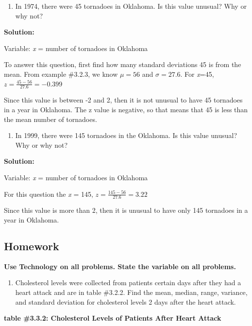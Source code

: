 \documentclass[
]{book}
\providecommand{\tightlist}{%
  \setlength{\itemsep}{0pt}\setlength{\parskip}{0pt}}
\begin{document}
\begin{enumerate}
\def\labelenumi{\alph{enumi}.}
\tightlist
\item
  In 1974, there were 45 tornadoes in Oklahoma. Is this value unusual? Why or why not?
\end{enumerate}

\textbf{Solution:}

Variable: \emph{x} = number of tornadoes in Oklahoma

To answer this question, first find how many standard deviations 45 is from the mean. From example \#3.2.3, we know \(\mu=56\) and \(\sigma=27.6\). For \emph{x}=45, \(z=\frac{45-56}{27.6}=-0.399\)

Since this value is between -2 and 2, then it is not unusual to have 45 tornadoes in a year in Oklahoma. The z value is negative, so that means that 45 is less than the mean number of tornadoes.

\begin{enumerate}
\def\labelenumi{\alph{enumi}.}
\setcounter{enumi}{1}
\tightlist
\item
  In 1999, there were 145 tornadoes in the Oklahoma. Is this value unusual? Why or why not?
\end{enumerate}

\textbf{Solution:}

Variable: \emph{x} = number of tornadoes in Oklahoma

For this question the \emph{x} = 145, \(z=\frac{145-56}{27.6}=3.22\)

Since this value is more than 2, then it is unusual to have only 145 tornadoes in a year in Oklahoma.

\hypertarget{homework-4}{%
\subsection{Homework}\label{homework-4}}

\textbf{Use Technology on all problems. State the variable on all problems.}

\begin{enumerate}
\def\labelenumi{\arabic{enumi}.}
\tightlist
\item
  Cholesterol levels were collected from patients certain days after they had a heart attack and are in table \#3.2.2. Find the mean, median, range, variance, and standard deviation for cholesterol levels 2 days after the heart attack.
\end{enumerate}

\textbf{table \#3.3.2: Cholesterol Levels of Patients After Heart Attack}
\end{document}

